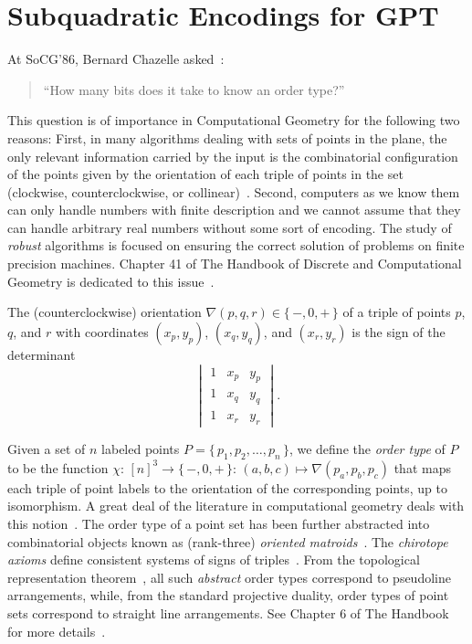 \section{Subquadratic Encodings for GPT}
At SoCG'86, Bernard Chazelle asked~\cite{GP93}:
\begin{quotation}
``How many bits does it take to know an order type?''
\end{quotation}

This question is of importance in Computational Geometry for the following two
reasons:
%
First, in many algorithms dealing with sets of points in the plane,
the only relevant information carried by the input is the combinatorial
configuration of the points given by the orientation of each triple of points in the
set (clockwise, counterclockwise, or collinear)~\cite{Knu92,Ed12,Epp18}.
%
Second, computers as we know them can only handle numbers with
finite description and we cannot assume that they can handle arbitrary
real numbers without some sort of encoding. The study of \emph{robust}
algorithms is focused on ensuring the correct solution of problems on finite
precision machines. Chapter 41 of The Handbook of Discrete and Computational
Geometry is dedicated to this issue~\cite{Ya04}.

The (counterclockwise) orientation \(\nabla(p,q,r) \in \{\, -, 0, +\,\}\) of a triple of points
\(p\), \(q\), and \(r\) with coordinates \((x_p, y_p)\), \((x_q, y_q)\), and
\((x_r, y_r)\) is the sign of the determinant
\begin{displaymath}
    \begin{vmatrix}
	1 & x_p & y_p \\
	1 & x_q & y_q \\
	1 & x_r & y_r
    \end{vmatrix}.
\end{displaymath}

Given a set of \(n\) labeled points \(P = \{\, p_1, p_2, \ldots, p_n\,\}\), we
define the \emph{order type} of \(P\) to be the function \(\chi \colon\,
{[n]}^3 \to \{\, -, 0, +\,\} \colon\, (a,b,c) \mapsto \nabla(p_a, p_b, p_c)\)
that maps each triple of point labels to the orientation of the corresponding
points, up to isomorphism.
%
\ifeurocg\else%
A great deal of the literature in computational geometry deals with this
notion~\cite{%
AAK02a,
AAK02b,
ACKLV16,
AKPV14,
AK01,
AK05,
AKMPW15,
AMP13,
Al86,
AILOW14,
BLSWZ93,
BMS01,
BRS92,
Epp18,
EHN99,
Fe96,
FV11,
FL78,
Go80,
GP83,
GP84,
GP86,
GP91,
GP93,
GPS89,
HM94,
HMMS11,
Knu92,
Le26,
MMIB12,
NV98,
Ri89,
RZ04,
Ri56,
St97%
}.
\fi%
The order type of a point set has been further abstracted into combinatorial
objects known as (rank-three) \emph{oriented matroids}~\cite{FL78}. The
\emph{chirotope axioms} define consistent systems of signs of
triples~\cite{BLSWZ93}.
%
From the topological representation theorem~\cite{BMS01}, all such
\emph{abstract} order types correspond to pseudoline arrangements, while, from
the standard projective duality, order types of point sets correspond to
straight line arrangements. See Chapter 6 of The Handbook for more
details~\cite{RZ04}.

